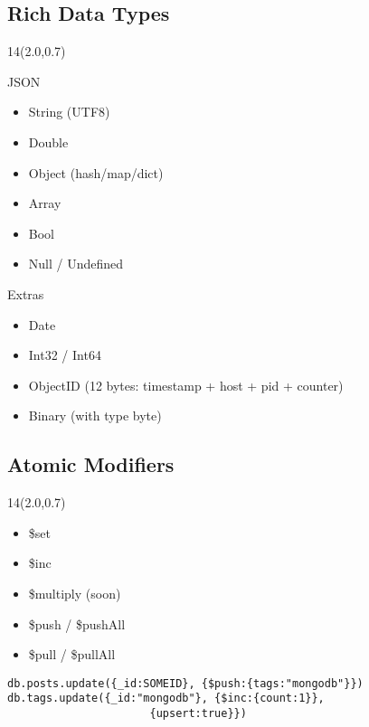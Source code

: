 \documentclass{beamer}
\newcommand{\MongoLogo}{
\begin{textblock}{14}(2.0,0.7)
  \pgfuseimage{logo}
\end{textblock}
}
\begin{document}
\subsection{Rich Data Types}
\begin{frame}[fragile]
  \MongoLogo
  \begin{block}{JSON}
  \begin{itemize}
    \item String (UTF8)
    \item Double
    \item Object (hash/map/dict)
    \item Array
    \item Bool
    \item Null / Undefined
  \end{itemize}
  \end{block}

  \begin{block}{Extras}
  \begin{itemize}
    \item Date
    \item Int32 / Int64
    \item ObjectID (12 bytes: timestamp + host + pid + counter)
    \item Binary (with type byte)
  \end{itemize}
  \end{block}
\end{frame}

  
\subsection{Atomic Modifiers}
\begin{frame}[fragile]
  \MongoLogo
  \begin{itemize}
    \item \$set
    \item \$inc
    \item \$multiply (soon)
    \item \$push / \$pushAll
    \item \$pull / \$pullAll
  \end{itemize}


    \begin{small}
    \begin{verbatim}
db.posts.update({_id:SOMEID}, {$push:{tags:"mongodb"}})
db.tags.update({_id:"mongodb"}, {$inc:{count:1}},
                      {upsert:true}})
    \end{verbatim}
    \end{small}
\end{frame}
\end{document}
